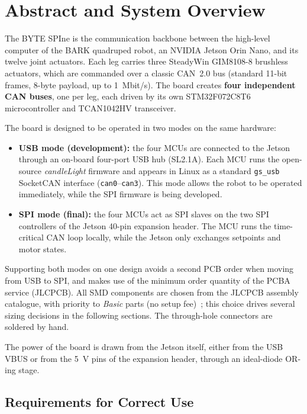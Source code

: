 \documentclass[11pt,a4paper]{article}
\begin{document}
\section{Abstract and System Overview}

The BYTE SPIne is the communication backbone between the high-level computer of the BARK
quadruped robot, an NVIDIA Jetson Orin Nano, and its twelve joint actuators. Each leg carries
three SteadyWin GIM8108-8 brushless actuators, which are commanded over a classic CAN~2.0
bus (standard 11-bit frames, 8-byte payload, up to \qty{1}{Mbit/s}). The board creates \textbf{four
independent CAN buses}, one per leg, each driven by its own STM32F072C8T6 microcontroller and
TCAN1042HV transceiver.

The board is designed to be operated in two modes on the same hardware:
\begin{itemize}
    \item \textbf{USB mode (development):} the four MCUs are connected to the Jetson through an
    on-board four-port USB hub (SL2.1A). Each MCU runs the open-source \textit{candleLight} firmware
    and appears in Linux as a standard \texttt{gs\_usb} SocketCAN interface (\texttt{can0}--\texttt{can3}). This mode
    allows the robot to be operated immediately, while the SPI firmware is being developed.
    \item \textbf{SPI mode (final):} the four MCUs act as SPI slaves on the two SPI controllers of the
    Jetson 40-pin expansion header. The MCU runs the time-critical CAN loop locally, while
    the Jetson only exchanges setpoints and motor states.
\end{itemize}

\noindent Supporting both modes on one design avoids a second PCB order when moving from USB to
SPI, and makes use of the minimum order quantity of the PCBA service (JLCPCB). All SMD
components are chosen from the JLCPCB assembly catalogue, with priority to \textit{Basic} parts (no
setup fee)~\cite{jlcparts}; this choice drives several sizing decisions in the following sections. The
through-hole connectors are soldered by hand.

The power of the board is drawn from the Jetson itself, either from the USB VBUS or from
the \qty{5}{V} pins of the expansion header, through an ideal-diode OR-ing stage.

\subsection{Requirements for Correct Use}\label{sec:req}
\end{document}
